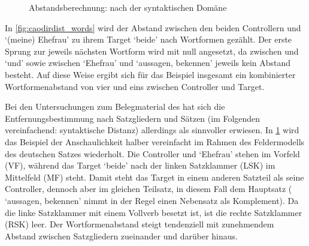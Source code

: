 \begin{figure}
\vspace{.5\baselineskip}
\caption{Abstandsberechnung: nach der syntaktischen Domäne}
\label{fig:caodirdist_syn}
\end{figure}

In \cref{fig:caodirdist_words} wird der Abstand zwischen den beiden Controllern
 und  `(meine) Ehefrau' zu ihrem Target
 `beide' nach Wortformen gezählt. Der erste Sprung zur jeweils
nächsten Wortform wird mit null angesetzt, da zwischen  und
 `und' sowie zwischen  `Ehefrau' und
 `aussagen, bekennen' jeweils kein Abstand besteht. Auf
diese Weise ergibt sich für das Beispiel insgesamt ein kombinierter Wortformenabstand von vier und
eins zwischen Controller und Target.

Bei den Untersuchungen zum Belegmaterial des \CAO{} hat sich die
Entfernungsbestimmung nach Satzgliedern und Sätzen (im Folgenden vereinfachend:
syntaktische Distanz) allerdings als sinnvoller erwiesen. In
\cref{fig:caodirdist_syn} wird das Beispiel der Anschaulichkeit halber
vereinfacht im Rahmen des Feldermodells des deutschen Satzes
\autocites{drach1963}{woellstein2010}[vgl.\ auch][43--51]{mueller2020}
wiederholt. Die Controller  und  `Ehefrau'
stehen im Vorfeld (VF), während das Target  `beide' nach der
linken Satzklammer (LSK) im Mittelfeld (MF) steht. Damit steht das Target in
einem anderen Satzteil als seine Controller, dennoch aber im gleichen Teilsatz,
in diesem Fall dem Hauptsatz ( `aussagen, bekennen' nimmt
in der Regel einen Nebensatz als Komplement). Da die linke Satzklammer mit
einem Vollverb besetzt ist, ist die rechte Satzklammer (RSK) leer. Der
Wortformenabstand steigt tendenziell mit zunehmendem Abstand zwischen
Satzgliedern zueinander und darüber hinaus.

